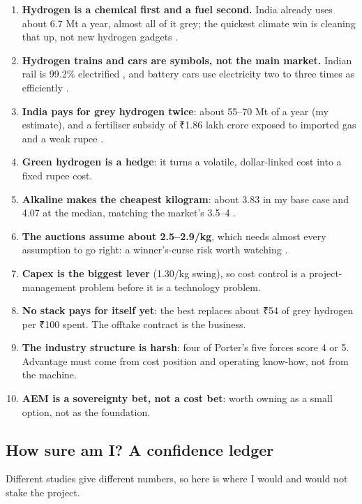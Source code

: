 \begin{enumerate}[leftmargin=1.6em,label={\color{audit}\display\arabic*},itemsep=3pt]
\item \textbf{Hydrogen is a chemical first and a fuel second.} India already uses about 6.7 Mt a year, almost all of it grey; the quickest climate win is cleaning that up, not new hydrogen gadgets \cite{igef2021}.
\item \textbf{Hydrogen trains and cars are symbols, not the main market.} Indian rail is 99.2\% electrified \cite{indinfra2025}, and battery cars use electricity two to three times as efficiently \cite{vw2020}.
\item \textbf{India pays for grey hydrogen twice}: about 55–70 Mt of \coo{} a year (my estimate), and a fertiliser subsidy of ₹1.86 lakh crore exposed to imported gas and a weak rupee \cite{skfert2026,kpmg2026}.
\item \textbf{Green hydrogen is a hedge}: it turns a volatile, dollar-linked cost into a fixed rupee cost.
\item \textbf{Alkaline makes the cheapest kilogram}: about \usd{}3.83 in my base case and \usd{}4.07 at the median, matching the market's \usd{}3.5–4 \cite{tribune2025}.
\item \textbf{The auctions assume about \usd{}2.5–2.9/kg}, which needs almost every assumption to go right: a winner's-curse risk worth watching \cite{seci2025}.
\item \textbf{Capex is the biggest lever} (\usd{}1.30/kg swing), so cost control is a project-management problem before it is a technology problem.
\item \textbf{No stack pays for itself yet}: the best replaces about ₹54 of grey hydrogen per ₹100 spent. The offtake contract is the business.
\item \textbf{The industry structure is harsh}: four of Porter's five forces score 4 or 5. Advantage must come from cost position and operating know-how, not from the machine.
\item \textbf{AEM is a sovereignty bet, not a cost bet}: worth owning as a small option, not as the foundation.
\end{enumerate}

\subsection{How sure am I? A confidence ledger}

Different studies give different numbers, so here is where I would and would not stake the project.

